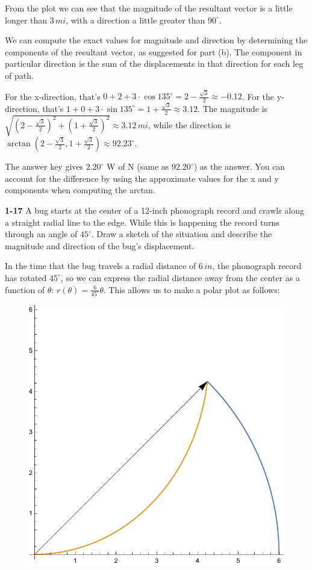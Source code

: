 \documentclass{amsart}
\begin{document}
From the plot we can see that the magnitude of the resultant vector is a little longer than $3\,mi$,
with a direction a little greater than $90^\circ$.

We can compute the exact values for magnitude and direction by determining the components of the resultant vector, as suggested for part (b).
The component in particular direction is the sum of the displacements in that direction for each leg of path.

For the x-direction, that's $0 + 2 + 3 \cdot \cos 135^\circ = 2 - \frac{\sqrt{3}}{2} \approx -0.12$.
For the y-direction, that's $1 + 0 + 3 \cdot \sin 135^\circ = 1 + \frac{\sqrt{3}}{2} \approx 3.12$.
The magnitude is $\sqrt{(2 - \frac{\sqrt{3}}{2})^2 + (1 + \frac{\sqrt{3}}{2})^2} \approx 3.12\,mi$,
while the direction is $\arctan(2 - \frac{\sqrt{3}}{2}, 1 + \frac{\sqrt{3}}{2}) \approx 92.23^\circ$.

The answer key gives $2.20^\circ$ W of N (same as $92.20^\circ$) as the answer.
You can account for the difference by using the approximate values for the x and y components
when computing the arctan.

\textbf{1-17} A bug starts at the center of a 12-inch phonograph record and crawls along a straight radial line to the edge.
While this is happening the record turns through an angle of $45^\circ$.
Draw a sketch of the situation and describe the magnitude and direction of the bug's displacement.

In the time that the bug travels a radial distance of $6\,in$, the phonograph record has rotated $45^\circ$,
so we can express the radial distance away from the center as a function of $\theta$: $r(\theta) = \frac{6}{45^\circ} \theta$.
This allows us to make a polar plot as follows:

\begin{figure}[h]
\includegraphics[scale=0.32]{1-17}
\end{figure}
\end{document}
